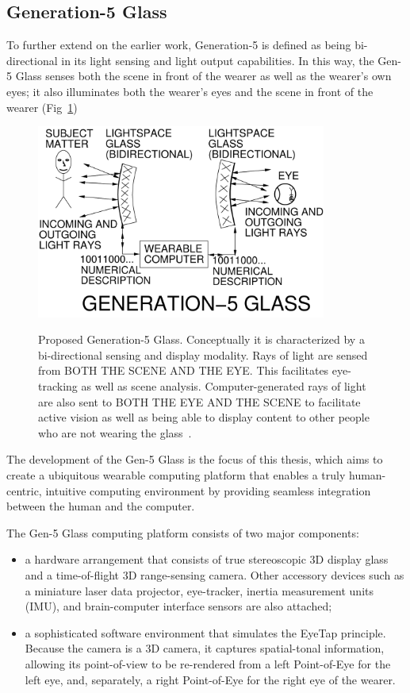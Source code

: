 \subsection{Generation-5 Glass}
To further extend on the earlier work, Generation-5 is defined as being bi-directional in its light sensing 
and light output capabilities.  In this way, the Gen-5 Glass senses both the scene in front of the wearer 
as well as the wearer's
own eyes; it also illuminates both the wearer's eyes and the scene in front of the wearer 
(Fig~\ref{fig:genfive})

\begin{figure}
  \centering
  \includegraphics[width=3.75in]{ch6/figs/GL455.pdf}\\
  \caption{Proposed Generation-5 Glass.  Conceptually it is characterized
           by a bi-directional sensing and display modality.  Rays of light
           are sensed from BOTH THE SCENE AND THE EYE.  This facilitates
           eye-tracking as well as scene analysis. Computer-generated rays of light are also sent to 
BOTH THE
           EYE AND THE SCENE to facilitate active vision as well as
           being able to display content to other people who are not wearing
           the glass~\cite{mann2013freeglass}.}
  \label{fig:genfive}
\end{figure}

The development of the Gen-5 Glass is the focus of this thesis, which aims to create a ubiquitous 
wearable computing platform that enables a truly human-centric, intuitive computing environment by 
providing seamless integration between the human and the computer.

The Gen-5 Glass computing platform consists of two major components:
\begin{itemize}
  \item a hardware arrangement that consists of true stereoscopic 3D display glass and a time-of-flight 
3D range-sensing camera.  Other accessory devices such as a
        miniature laser data projector, eye-tracker, inertia measurement units (IMU), and brain-computer 
interface   sensors are also attached;
  \item a sophisticated software environment that simulates the EyeTap
        principle.  Because the camera is a 3D camera, it captures spatial-tonal
        information, allowing its point-of-view to be re-rendered from a
        left Point-of-Eye for the left eye, and, separately, a
        right Point-of-Eye for the right eye of the wearer.
\end{itemize}

